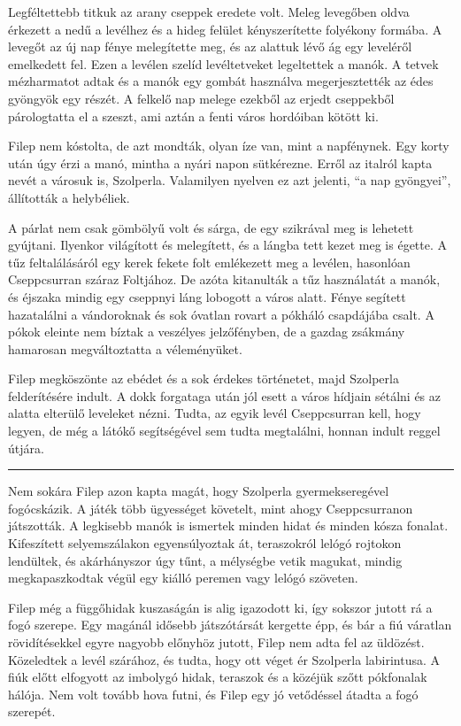 \documentclass[10pt]{memoir}
\renewcommand{\pfbreakdisplay}{\bigskip \ding{166} \bigskip}
\newcommand{\secbreak}{\fancybreak{\pfbreakdisplay}\indent}
\begin{document}
Legféltettebb titkuk az arany cseppek eredete volt. Meleg levegőben oldva
érkezett a nedű a levélhez és a hideg felület kényszerítette folyékony formába.
A levegőt az új nap fénye melegítette meg, és az alattuk lévő ág egy leveléről
emelkedett fel. Ezen a levélen szelíd levéltetveket legeltettek a manók. A
tetvek mézharmatot adtak és a manók egy gombát használva megerjesztették az
édes gyöngyök egy részét. A felkelő nap melege ezekből az erjedt cseppekből
párologtatta el a szeszt, ami aztán a fenti város hordóiban kötött ki.

Filep nem kóstolta, de azt mondták, olyan íze van, mint a napfénynek. Egy korty
után úgy érzi a manó, mintha a nyári napon sütkérezne. Erről az italról kapta
nevét a városuk is, Szolperla. Valamilyen nyelven ez azt jelenti, ``a nap
gyöngyei'', állították a helybéliek.

A párlat nem csak gömbölyű volt és sárga, de egy szikrával meg is lehetett
gyújtani. Ilyenkor világított és melegített, és a lángba tett kezet meg is
égette. A tűz feltalálásáról egy kerek fekete folt emlékezett meg a levélen,
hasonlóan Cseppcsurran száraz Foltjához. De azóta kitanulták a tűz használatát
a manók, és éjszaka mindig egy cseppnyi láng lobogott a város alatt. Fénye
segített hazatalálni a vándoroknak és sok óvatlan rovart a pókháló csapdájába
csalt. A pókok eleinte nem bíztak a veszélyes jelzőfényben, de a gazdag
zsákmány hamarosan megváltoztatta a véleményüket.

Filep megköszönte az ebédet és a sok érdekes történetet, majd Szolperla
felderítésére indult. A dokk forgataga után jól esett a város hídjain sétálni
és az alatta elterülő leveleket nézni. Tudta, az egyik levél Cseppcsurran kell,
hogy legyen, de még a látókő segítségével sem tudta megtalálni, honnan indult
reggel útjára.

\secbreak

Nem sokára Filep azon kapta magát, hogy Szolperla gyermekseregével fogócskázik.
A játék több ügyességet követelt, mint ahogy Cseppcsurranon játszották. A
legkisebb manók is ismertek minden hidat és minden kósza fonalat. Kifeszített
selyemszálakon egyensúlyoztak át, teraszokról lelógó rojtokon lendültek, és
akárhányszor úgy tűnt, a mélységbe vetik magukat, mindig megkapaszkodtak végül
egy kiálló peremen vagy lelógó szöveten.

Filep még a függőhidak kuszaságán is alig igazodott ki, így sokszor jutott rá a
fogó szerepe. Egy magánál idősebb játszótársát kergette épp, és bár a fiú
váratlan rövidítésekkel egyre nagyobb előnyhöz jutott, Filep nem adta fel az
üldözést. Közeledtek a levél szárához, és tudta, hogy ott véget ér Szolperla
labirintusa. A fiúk előtt elfogyott az imbolygó hidak, teraszok és a közéjük
szőtt pókfonalak hálója. Nem volt tovább hova futni, és Filep egy jó vetődéssel
átadta a fogó szerepét.
\end{document}
